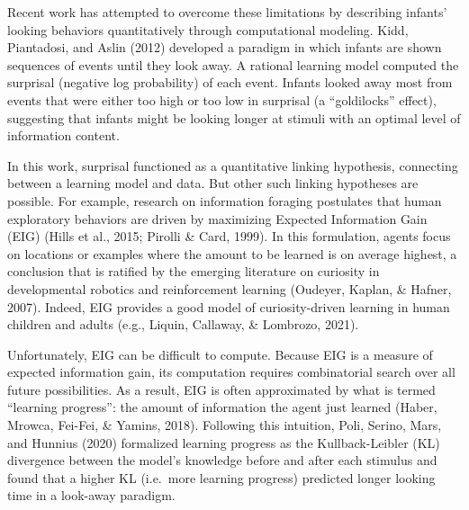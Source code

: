 \documentclass[
  man,floatsintext]{apa6}
\begin{document}
Recent work has attempted to overcome these limitations by describing infants' looking behaviors quantitatively through computational modeling. Kidd, Piantadosi, and Aslin (2012) developed a paradigm in which infants are shown sequences of events until they look away. A rational learning model computed the surprisal (negative log probability) of each event. Infants looked away most from events that were either too high or too low in surprisal (a ``goldilocks'' effect), suggesting that infants might be looking longer at stimuli with an optimal level of information content.

In this work, surprisal functioned as a quantitative linking hypothesis, connecting between a learning model and data. But other such linking hypotheses are possible. For example, research on information foraging postulates that human exploratory behaviors are driven by maximizing Expected Information Gain (EIG) (Hills et al., 2015; Pirolli \& Card, 1999). In this formulation, agents focus on locations or examples where the amount to be learned is on average highest, a conclusion that is ratified by the emerging literature on curiosity in developmental robotics and reinforcement learning (Oudeyer, Kaplan, \& Hafner, 2007). Indeed, EIG provides a good model of curiosity-driven learning in human children and adults (e.g., Liquin, Callaway, \& Lombrozo, 2021).

Unfortunately, EIG can be difficult to compute. Because EIG is a measure of expected information gain, its computation requires combinatorial search over all future possibilities. As a result, EIG is often approximated by what is termed ``learning progress'': the amount of information the agent just learned (Haber, Mrowca, Fei-Fei, \& Yamins, 2018). Following this intuition, Poli, Serino, Mars, and Hunnius (2020) formalized learning progress as the Kullback-Leibler (KL) divergence between the model's knowledge before and after each stimulus and found that a higher KL (i.e.~more learning progress) predicted longer looking time in a look-away paradigm.
\end{document}
